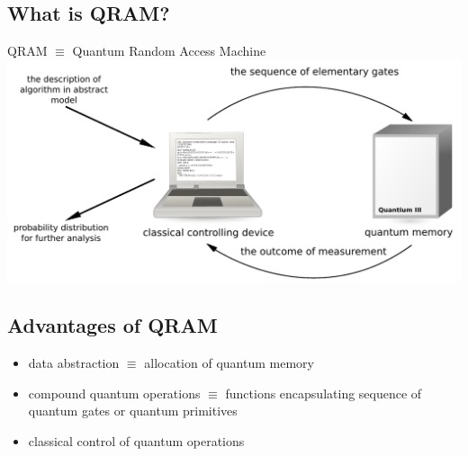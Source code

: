 \documentclass{beamer}
\begin{document}
\subsection{What is QRAM?}
\begin{frame}{\insertsection}{\insertsubsection}
	\begin{center}
	QRAM $\equiv$ Quantum Random Access Machine\\[12pt]
    \includegraphics[width=\textwidth]{pics/qram}
\end{center}
\end{frame}

\subsection{Advantages of QRAM}
\begin{frame}{\insertsection}{\insertsubsection}
	
\begin{itemize}
	\item data abstraction $\equiv$ allocation of quantum memory
	\item compound quantum operations $\equiv$ functions encapsulating sequence of quantum gates or quantum primitives
	\item classical control of quantum operations 
\end{itemize}

\end{frame}

\end{document}
